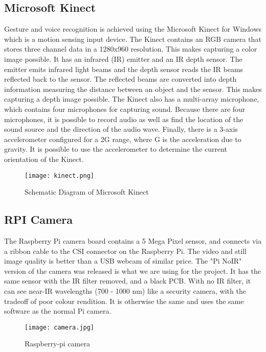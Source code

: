 \subsection{Microsoft Kinect}
Gesture and voice recognition is achieved using the Microsoft Kinect for Windows which is a motion sensing input device. The Kinect contains an RGB camera that stores three channel data in a 1280x960 resolution. This makes capturing a color image possible. It has an infrared (IR) emitter and an IR depth sensor. The emitter emits infrared light beams and the depth sensor reads the IR beams reflected back to the sensor. The reflected beams are converted into depth information measuring the distance between an object and the sensor. This makes capturing a depth image possible. The Kinect also has a multi-array microphone, which contains four microphones for capturing sound. Because there are four microphones, it is possible to record audio as well as find the location of the sound source and the direction of the audio wave. Finally, there is a 3-axis accelerometer configured for a 2G range, where G is the acceleration due to gravity. It is possible to use the accelerometer to determine the current orientation of the Kinect.

\begin{figure}[H]
  \centering
  \texttt{[image: kinect.png]}
  \caption{Schematic Diagram of Microsoft Kinect}
  \label{kinect}	
\end{figure}

\subsection{RPI Camera}
The Raspberry Pi camera board contains a 5 Mega Pixel sensor, and connects via a ribbon cable to the CSI connector on the Raspberry Pi. The video and still image quality is better than a USB webcam of similar price. The "Pi NoIR" version of the camera was released is what we are using for the project. It has the same sensor with the IR filter removed, and a black PCB. With no IR filter, it can see near-IR wavelengths (700 - 1000 nm) like a security camera, with the tradeoff of poor colour rendition. It is otherwise the same and uses the same software as the normal Pi camera.

\begin{figure}[H]
  \centering
  \texttt{[image: camera.jpg]}
  \caption{Raspberry-pi camera}
  \label{RPI camera}	
\end{figure}

